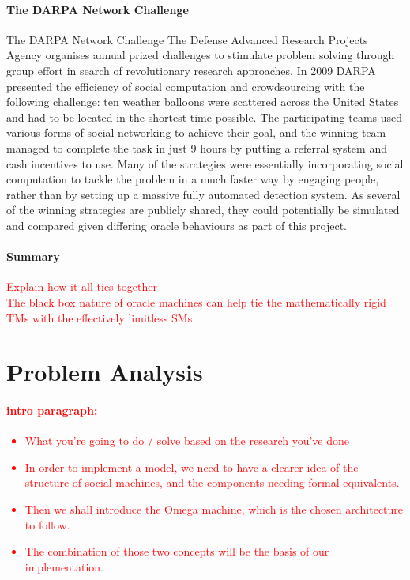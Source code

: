 \documentclass[12pt,a4,xcolor=table]{article}
\begin{document}
{	\paragraph{The DARPA Network Challenge}
	The DARPA Network Challenge The Defense Advanced Research Projects Agency organises annual prized challenges to stimulate problem solving through group effort in search of revolutionary research approaches. In 2009 DARPA presented the efficiency of social computation and crowdsourcing with the following challenge: ten weather balloons were scattered across the United States and had to be located in the shortest time possible. The participating teams used various forms of social networking to achieve their goal, and the winning team managed to complete the task in just 9 hours by putting a referral system and cash incentives to use. Many of the strategies were essentially incorporating social computation to tackle the problem in a much faster way by engaging people, rather than by setting up a massive fully automated detection system\cite{Robertson2013}. As several of the winning strategies are publicly shared\cite{tang2011reflecting}, they could potentially be simulated and compared given differing oracle behaviours as part of this project.
}

	\paragraph{Summary}
	\textcolor{red}{
		Explain how it all ties together\\
		The black box nature of oracle machines can help tie the mathematically rigid TMs with the effectively limitless SMs  
	}

	\section{Problem Analysis}
	\textcolor{red}{
	\paragraph{intro paragraph: }
	\begin{itemize}
		\item What you're going to do / solve based on the research you've done
		\item In order to implement a model, we need to have a clearer idea of the structure of social machines, and the components needing formal equivalents.
		\item Then we shall introduce the Omega machine, which is the chosen architecture to follow.
		\item The combination of those two concepts will be the basis of our implementation.
	\end{itemize} 
	}
\end{document}
